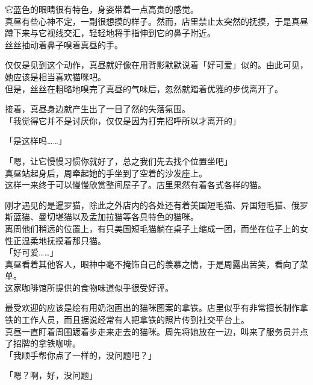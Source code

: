 它蓝色的眼睛很有特色，身姿带着一点高贵的感觉。\\

真昼有些心神不定，一副很想摸的样子。然而，店里禁止太突然的抚摸，于是真昼蹲下来与它视线交汇，轻轻地将手指伸到它的鼻子附近。\\

丝丝抽动着鼻子嗅着真昼的手。

仅仅是见到这个动作，真昼就好像在用背影默默说着「好可爱」似的。由此可见，她应该是相当喜欢猫咪吧。\\

但是，丝丝在粗略地嗅完了真昼的气味后，忽然就踏着优雅的步伐离开了。

接着，真昼身边就产生出了一目了然的失落氛围。\\

「我觉得它并不是讨厌你，仅仅是因为打完招呼所以才离开的」

「是这样吗……」

「嗯，让它慢慢习惯你就好了，总之我们先去找个位置坐吧」\\

真昼站起身后，周牵起她的手坐到了空着的沙发座上。\\

这样一来终于可以慢慢欣赏整间屋子了。店里果然有着各式各样的猫。

刚才遇见的是暹罗猫，除此之外店内的各处还有着美国短毛猫、异国短毛猫、俄罗斯蓝猫、曼切堪猫以及孟加拉猫等各具特色的猫咪。\\

离周他们稍远的位置上，有只美国短毛猫躺在桌子上缩成一团，而坐在位子上的女性正温柔地抚摸着那只猫。\\

「好可爱……」\\

真昼看着其他客人，眼神中毫不掩饰自己的羡慕之情，于是周露出苦笑，看向了菜单。\\

这家咖啡馆所提供的食物味道似乎很受好评。

最受欢迎的应该是绘有用奶泡画出的猫咪图案的拿铁。店里似乎有非常擅长制作拿铁的工作人员，而且据说经常有人把拿铁的照片传到社交平台上。\\

真昼一直盯着周围踱着步走来走去的猫咪。周先将她放在一边，叫来了服务员并点了招牌的拿铁咖啡。\\

「我顺手帮你点了一样的，没问题吧？」

「嗯？啊，好，没问题」\\

